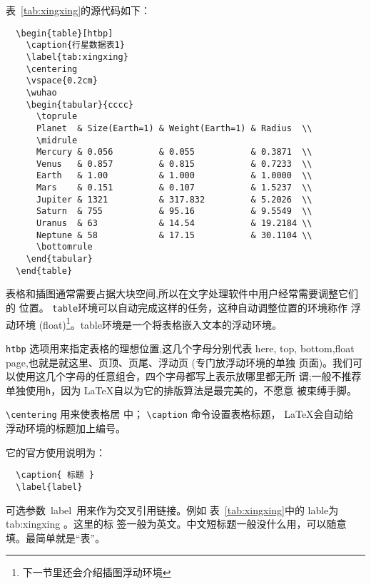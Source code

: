 表~\ref{tab:xingxing}的源代码如下：
\vspace{1em}
\begin{lstlisting}
  \begin{table}[htbp]
    \caption{行星数据表1}
    \label{tab:xingxing}
    \centering
    \vspace{0.2cm}
    \wuhao
    \begin{tabular}{cccc}
      \toprule
      Planet  & Size(Earth=1) & Weight(Earth=1) & Radius  \\
      \midrule
      Mercury & 0.056         & 0.055           & 0.3871  \\
      Venus   & 0.857         & 0.815           & 0.7233  \\
      Earth   & 1.00          & 1.000           & 1.0000  \\
      Mars    & 0.151         & 0.107           & 1.5237  \\
      Jupiter & 1321          & 317.832         & 5.2026  \\
      Saturn  & 755           & 95.16           & 9.5549  \\
      Uranus  & 63            & 14.54           & 19.2184 \\
      Neptune & 58            & 17.15           & 30.1104 \\
      \bottomrule
    \end{tabular}
  \end{table}
\end{lstlisting}

表格和插图通常需要占据大块空间,所以在文字处理软件中用户经常需要调整它们的
位置。 \texttt{table}环境可以自动完成这样的任务，这种自动调整位置的环境称作
浮动环境 (float)\footnote{下一节里还会介绍插图浮动环境}。table环境是一个将表格嵌入文本的浮动环境。

\texttt{htbp} 选项用来指定表格的理想位置,这几个字母分别代表 here, top,
bottom,float page,也就是就这里、页顶、页尾、浮动页 (专门放浮动环境的单独
页面)。我们可以使用这几个字母的任意组合，四个字母都写上表示放哪里都无所
谓;一般不推荐单独使用\texttt{h}，因为 \LaTeX{}自以为它的排版算法是最完美的，不愿意
被束缚手脚。

\verb|\centering| 用来使表格居
中； \verb|\caption| 命令设置表格标题， \LaTeX{}会自动给
浮动环境的标题加上编号。

它的官方使用说明为：
\begin{lstlisting}
  \caption{ 标题 }
  \label{label}
\end{lstlisting}
可选参数~label~用来作为交叉引用链接。例如
表~\ref{tab:xingxing}中的 lable为 tab:xingxing 。这里的标
签一般为英文。中文短标题一般没什么用，可以随意填。最简单就是“表”。

